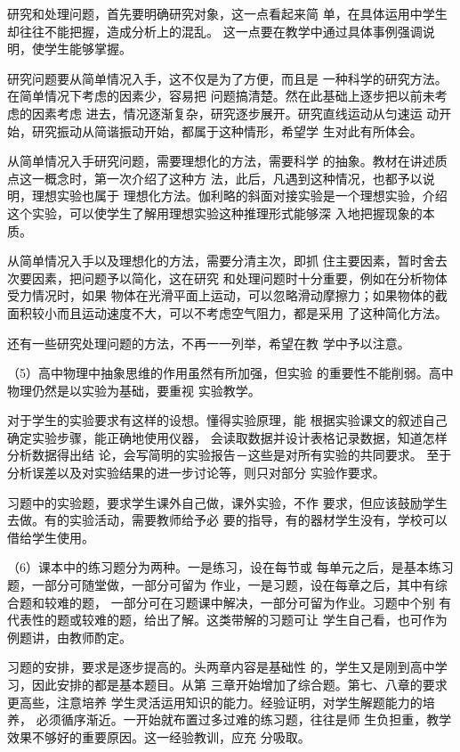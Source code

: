 研究和处理问题，首先要明确研究对象，这一点看起来简
单，在具体运用中学生却往往不能把握，造成分析上的混乱。
这一点要在教学中通过具体事例强调说明，使学生能够掌握。

研究问题要从简单情况入手，这不仅是为了方便，而且是
一种科学的研究方法。在简单情况下考虑的因素少，容易把
问题搞清楚。然在此基础上逐步把以前未考虑的因素考虑
进去，情况逐渐复杂，研究逐步展开。研究直线运动从匀速运
动开始，研究振动从简谐振动开始，都属于这种情形，希望学
生对此有所体会。

从简单情况入手研究问题，需要理想化的方法，需要科学
的抽象。教材在讲述质点这一概念时，第一次介绍了这种方
法，此后，凡遇到这种情况，也都予以说明，理想实验也属于
理想化方法。伽利略的斜面对接实验是一个理想实验，介绍
这个实验，可以使学生了解用理想实验这种推理形式能够深
入地把握现象的本质。

从简单情况入手以及理想化的方法，需要分清主次，即抓
住主要因素，暂时舍去次要因素，把问题予以简化，这在研究
和处理问题时十分重要，例如在分析物体受力情况时，如果
物体在光滑平面上运动，可以忽略滑动摩擦力；如果物体的截
面积较小而且运动速度不大，可以不考虑空气阻力，都是采用
了这种简化方法。

还有一些研究处理问题的方法，不再一一列举，希望在教
学中予以注意。

（5）高中物理中抽象思维的作用虽然有所加强，但实验
的重要性不能削弱。高中物理仍然是以实验为基础，要重视
实验教学。

对于学生的实验要求有这样的设想。懂得实验原理，能
根据实验课文的叙述自己确定实验步骤，能正确地使用仪器，
会读取数据并设计表格记录数据，知道怎样分析数据得出结
论，会写简明的实验报告－这些是对所有实验的共同要求。
至于分析误差以及对实验结果的进一步讨论等，则只对部分
实验作要求。

习题中的实验题，要求学生课外自己做，课外实验，不作
要求，但应该鼓励学生去做。有的实验活动，需要教师给予必
要的指导，有的器材学生没有，学校可以借给学生使用。

（6）课本中的练习题分为两种。一是练习，设在每节或
每单元之后，是基本练习题，一部分可随堂做，一部分可留为
作业，一是习题，设在每章之后，其中有综合题和较难的题，
一部分可在习题课中解决，一部分可留为作业。习题中个别
有代表性的题或较难的题，给出了解。这类带解的习题可让
学生自己看，也可作为例题讲，由教师酌定。

习题的安排，要求是逐步提高的。头两章内容是基础性
的，学生又是刚到高中学习，因此安排的都是基本题目。从第
三章开始增加了综合题。第七、八章的要求更高些，注意培养
学生灵活运用知识的能力。经验证明，对学生解题能力的培养，
必须循序渐近。一开始就布置过多过难的练习题，往往是师
生负担重，教学效果不够好的重要原因。这一经验教训，应充
分吸取。

